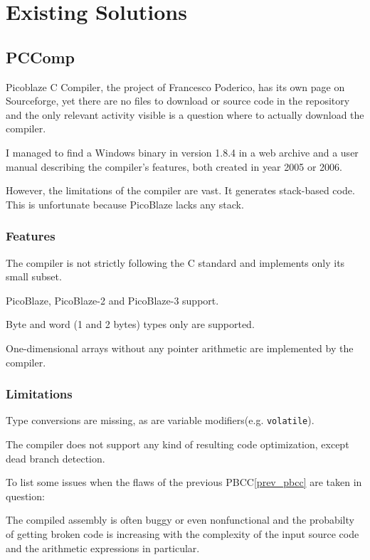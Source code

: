 \chapter{Existing Solutions}\label{existing}

    \section{PCComp}\label{pccomp}

    Picoblaze C Compiler, the project of Francesco Poderico, has its own page on Sourceforge, 
    yet there are no files to download or source code in the repository and the only relevant activity visible is a question where to actually download the compiler.

    I managed to find a Windows binary in version 1.8.4 in a web archive and a user manual describing the compiler's features, both created in year 2005 or 2006.

    However, the limitations of the compiler are vast. It generates stack-based code. This is unfortunate because PicoBlaze lacks any stack. 

        \subsection{Features}

        The compiler is not strictly following the C standard and implements only its small subset.

        PicoBlaze, PicoBlaze-2 and PicoBlaze-3 support.

        Byte and word (1 and 2 bytes) types only are supported.

        One-dimensional arrays without any pointer arithmetic are implemented by the compiler.

        \subsection{Limitations}

        Type conversions are missing, as are variable modifiers(e.g. \texttt{volatile}). 

        The compiler does not support any kind of resulting code optimization, except dead branch detection.

        To list some issues when the flaws of the previous PBCC\ref{prev_pbcc} are taken in question:

        The compiled assembly is often buggy or even nonfunctional and the probabilty of getting broken code is increasing with the complexity of the input source code and the arithmetic expressions in particular.

